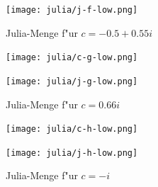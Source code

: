 \begin{refsection}
\begin{figure}
\begin{center}
\bigskip

\texttt{[image: julia/j-f-low.png]}
\end{center}
\caption{Julia-Menge f"ur $c= -0.5+0.55i$\label{julia:f}}
\end{figure}

\begin{figure}
\begin{center}
\texttt{[image: julia/c-g-low.png]}

\bigskip

\texttt{[image: julia/j-g-low.png]}
\end{center}
\caption{Julia-Menge f"ur $c= 0.66i$\label{julia:g}}
\end{figure}

\begin{figure}
\begin{center}
\texttt{[image: julia/c-h-low.png]}

\bigskip

\texttt{[image: julia/j-h-low.png]}
\end{center}
\caption{Julia-Menge f"ur $c= -i$\label{julia:h}}
\end{figure}

\printbibliography[heading=subbibliography]
\end{refsection}
